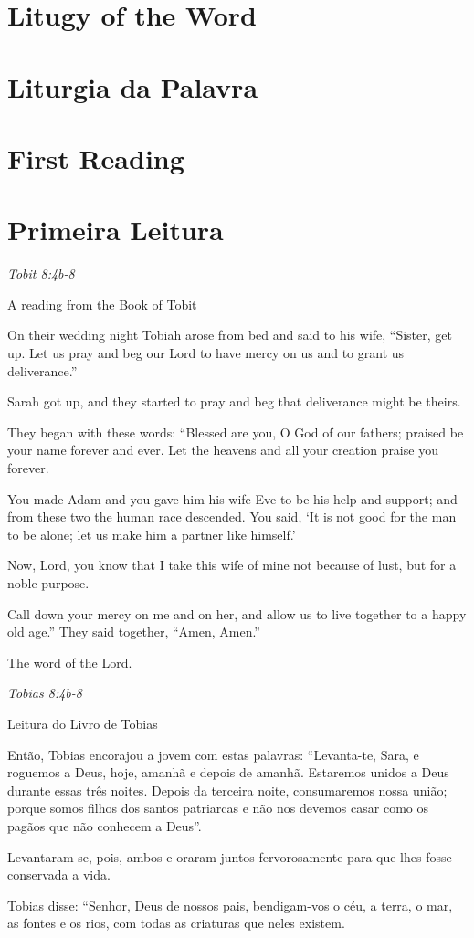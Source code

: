 \documentclass[10pt,a5]{article}
\newcommand \sect[2] {\section*{#1} \switchcolumn \section*{#2} \switchcolumn*}
\begin{document}
\begin{paracol}{2}

 \sect{Litugy of the Word}{Liturgia da Palavra}

 \sect{First Reading}{Primeira Leitura}

 \textit{Tobit 8:4b-8}

\hspace{2em} A reading from the Book of Tobit

On their wedding night Tobiah arose from bed and said to his wife,
“Sister, get up. Let us pray and beg our Lord to have mercy on
us and to grant us deliverance.”

Sarah got up, and they started to pray
and beg that deliverance might be theirs.

They began with these words:
“Blessed are you, O God of our fathers;
praised be your name forever and ever.
Let the heavens and all your creation
praise you forever.

You made Adam and you gave him his wife Eve to be his help
and support;
and from these two the human race descended.
You said, ‘It is not good for the man to be alone;
let us make him a partner like himself.’

Now, Lord, you know that I take this wife of mine not because
of lust,
but for a noble purpose.

Call down your mercy on me and on her,
and allow us to live together to a happy old age.”
They said together, “Amen, Amen.”

The word of the Lord.


\switchcolumn

\textit{Tobias 8:4b-8}

\hspace{2em} Leitura do Livro de Tobias

Então, Tobias encorajou a jovem com estas palavras: “Levanta-te, Sara, e roguemos a Deus, hoje, amanhã e depois de amanhã. Estaremos unidos a Deus durante essas três noites. Depois da terceira noite, consumaremos nossa união;
porque somos filhos dos santos patriarcas e não nos devemos casar como os pagãos que não conhecem a Deus”.

Levantaram-se, pois, ambos e oraram juntos fervorosamente para que lhes fosse conservada a vida.

Tobias disse: “Senhor, Deus de nossos pais, bendigam-vos o céu, a terra, o mar, as fontes e os rios, com todas as criaturas que neles existem.


\end{paracol}
\end{document}
